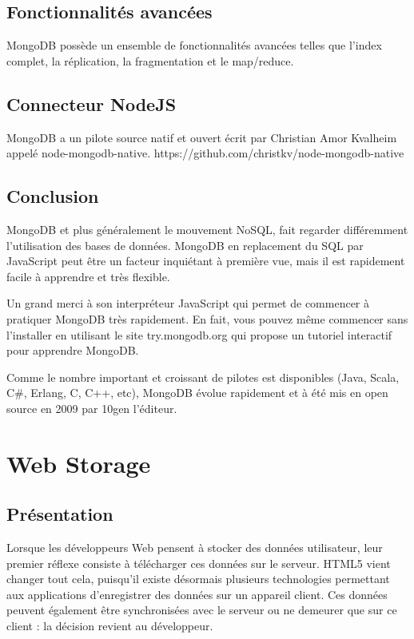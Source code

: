 \subsection{Fonctionnalités avancées}

MongoDB possède un ensemble de fonctionnalités avancées telles que l’index complet, la réplication, la fragmentation et le map/reduce.

\subsection{Connecteur NodeJS}

MongoDB a un pilote source natif et ouvert écrit par Christian Amor Kvalheim appelé node-mongodb-native.
https://github.com/christkv/node-mongodb-native

\subsection{Conclusion}

MongoDB et plus généralement le mouvement NoSQL, fait regarder différemment l’utilisation des bases de données. MongoDB en replacement du SQL par JavaScript peut être un facteur inquiétant à première vue, mais il est rapidement facile à apprendre et très flexible.

Un grand merci à son interpréteur JavaScript qui permet de commencer à pratiquer MongoDB très rapidement.  En fait, vous pouvez même commencer sans l’installer en utilisant le site try.mongodb.org qui propose un tutoriel interactif pour apprendre MongoDB.

Comme le nombre important et croissant de pilotes est disponibles (Java, Scala, C\#, Erlang, C, C++, etc), MongoDB évolue rapidement et à été mis en open source en 2009 par 10gen l’éditeur.

\section{Web Storage}

\subsection{Présentation}

Lorsque les développeurs Web pensent à stocker des données utilisateur, leur premier réflexe consiste à télécharger ces données sur le serveur. HTML5 vient changer tout cela, puisqu'il existe désormais plusieurs technologies permettant aux applications d'enregistrer des données sur un appareil client. Ces données peuvent également être synchronisées avec le serveur ou ne demeurer que sur ce client : la décision revient au développeur.

